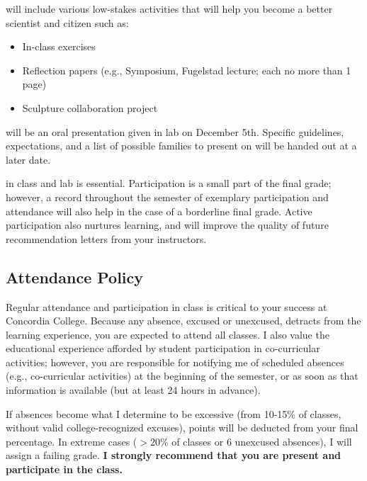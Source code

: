 \documentclass{tufte-handout}
\begin{document}
\begin{fullwidth}
 will include various low-stakes activities that will help you become a better scientist and citizen such as:

\begin{itemize}
	\item In-class exercises
	\item Reflection papers (e.g., Symposium, Fugelstad lecture; each no more than 1 page)
	\item Sculpture collaboration project
\end{itemize}

 will be an oral presentation given in lab on December 5th. Specific guidelines, expectations, and a list of possible families to present on will be handed out at a later date.


 in class and lab is essential. Participation is a small part of the final grade; however, a record throughout the semester of exemplary participation and attendance will also help in the case of a borderline final grade. Active participation also nurtures learning, and will improve the quality of future recommendation letters from your instructors.  



\subsection{Attendance Policy}

Regular attendance and participation in class is critical to your success at Concordia College. Because any absence, excused or unexcused, detracts from the learning experience, you are expected to attend all classes. I also value the educational experience afforded by student participation in co-curricular activities; however, you are responsible for notifying me of scheduled absences (e.g., co-curricular activities) at the beginning of the semester, or as soon as that information is available (but at least 24 hours in advance). 

If absences become what I determine to be excessive (from 10-15\% of classes, without valid college-recognized excuses), points will be deducted from your final percentage. In extreme cases ($>20$\% of classes or 6 unexcused absences), I will assign a failing grade. \textbf{I strongly recommend that you are present and participate in the class.}



\end{fullwidth}
\end{document}
